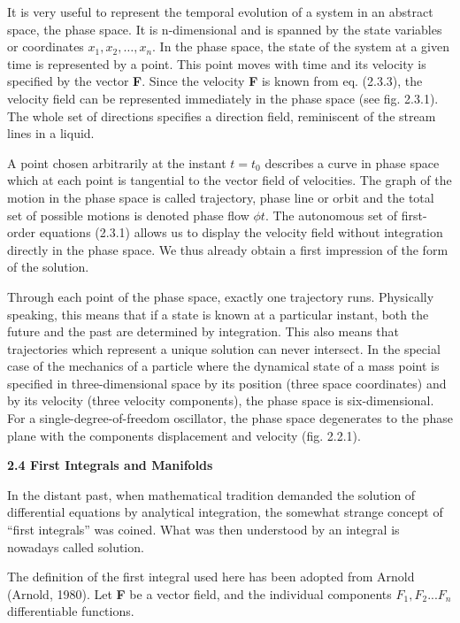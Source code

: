 \documentclass[12pt]{article}
\begin{document}
It is very useful to represent the temporal evolution of a system in an abstract
space, the phase space. It is n-dimensional and is spanned by the state variables or
coordinates $x_1, x_2, …  , x_n$. In the phase space, the state of the system at a given
time is represented by a point. This point moves with time and its velocity is specified
by the vector \textbf{F}. Since the velocity \textbf{F} is known from eq. (2.3.3), the velocity
field can be represented immediately in the phase space (see fig. 2.3.1). The whole
set of directions specifies a direction field, reminiscent of the stream lines in a liquid.

\hfill

A point chosen arbitrarily at the instant $t = t_0$ describes a curve in phase space
which at each point is tangential to the vector field of velocities. The graph of the
motion in the phase space is called trajectory, phase line or orbit and the total
set of possible motions is denoted phase flow $\phi t$. The autonomous set of first-order
equations (2.3.1) allows us to display the velocity field without integration directly
in the phase space. We thus already obtain a first impression of the form of the
solution.

\hfill

Through each point of the phase space, exactly one trajectory runs. Physically
speaking, this means that if a state is known at a particular instant, both the
future and the past are determined by integration. This also means that trajectories
which represent a unique solution can never intersect. In the special case
of the mechanics of a particle where the dynamical state of a mass point is specified
in three-dimensional space by its position (three space coordinates) and by
its velocity (three velocity components), the phase space is six-dimensional. For a
single-degree-of-freedom oscillator, the phase space degenerates to the phase plane
with the components displacement and velocity (fig. 2.2.1).

\hfill

\textbf{2.4 First Integrals and Manifolds}

\hfill

In the distant past, when mathematical tradition demanded the solution of differential
equations by analytical integration, the somewhat strange concept of “first
integrals” was coined. What was then understood by an integral is nowadays called
solution.

\hfill

The definition of the first integral used here has been adopted from Arnold
(Arnold, 1980). Let \textbf{F} be a vector field, and the individual components $F_1, F_2 . . . F_n$
differentiable functions.
\end{document}
